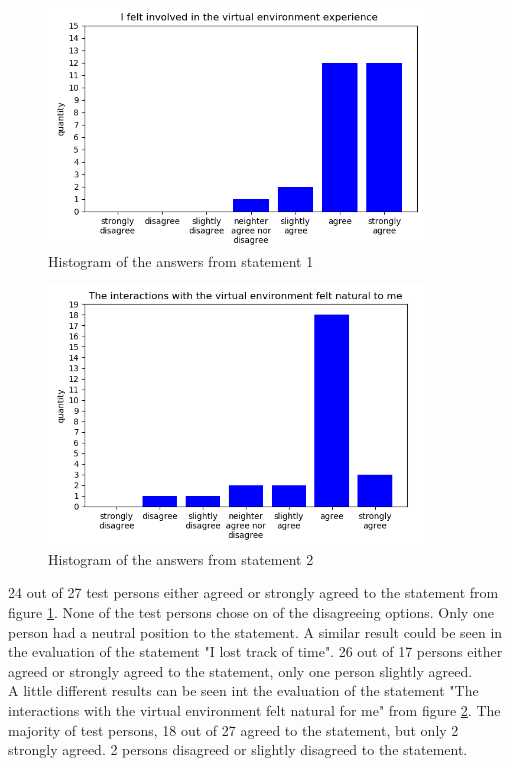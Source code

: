 \begin{figure}[h!]
  \includegraphics[width=10cm]{kapitel/charts/immersion-1.png}
  \centering
  \caption{Histogram of the answers from statement 1}
  \label{fig:chart-immersion-1}
\end{figure}
\begin{figure}[h!]
  \includegraphics[width=10cm]{kapitel/charts/immersion-2.png}
  \centering
  \caption{Histogram of the answers from statement 2}
  \label{fig:chart-immersion-2}
\end{figure}
24 out of 27 test persons either agreed or strongly agreed to the statement from figure \ref{fig:chart-immersion-1}. None of the test persons chose on of the disagreeing options. Only one person had a neutral position to the statement. A similar result could be seen in the evaluation of the statement "I lost track of time". 26 out of 17 persons either agreed or strongly agreed to the statement, only one person slightly agreed. \\
A little different results can be seen int the evaluation of the statement "The interactions with the virtual environment felt natural for me" from figure \ref{fig:chart-immersion-2}. The majority of test persons, 18 out of 27 agreed to the statement, but only 2 strongly agreed. 2 persons disagreed or slightly disagreed to the statement.\\

